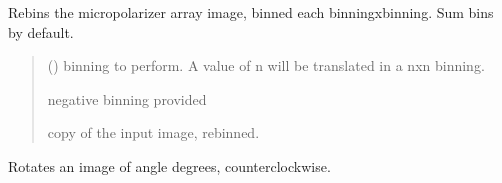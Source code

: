 \documentclass[letterpaper,10pt,english]{sphinxmanual}
\begin{document}
\begin{fulllineitems}

\begin{fulllineitems}
\label{\detokenize{micropolarray:micropolarray.micropol_image.MicropolImage.rebin}}
\pysigstartsignatures
{}
\pysigstopsignatures
\sphinxAtStartPar
Rebins the micropolarizer array image, binned each
binningxbinning. Sum bins by default.
\begin{quote}\begin{description}
\sphinxAtStartPar
{} () \textendash{} binning to perform. A value of n will be translated in a nxn binning.

\sphinxAtStartPar
{} \textendash{} negative binning provided

\sphinxAtStartPar
copy of the input image, rebinned.

\sphinxAtStartPar
{\hyperref[\detokenize{micropolarray:micropolarray.micropol_image.MicropolImage}]{}}

\end{description}\end{quote}

\end{fulllineitems}


\begin{fulllineitems}
\label{\detokenize{micropolarray:micropolarray.micropol_image.MicropolImage.rotate}}
\pysigstartsignatures
{}
\pysigstopsignatures
\sphinxAtStartPar
Rotates an image of angle degrees, counter\sphinxhyphen{}clockwise.


\end{fulllineitems}
\end{fulllineitems}
\end{document}
